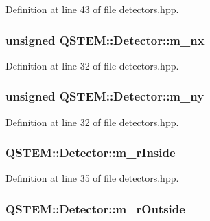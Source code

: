 Definition at line 43 of file detectors.\-hpp.

\hypertarget{class_q_s_t_e_m_1_1_detector_a98a9b7fbcb0b63cc3a4f3bedccf3b130}{
\subsubsection[{m\-\_\-nx}]{\setlength{\rightskip}{0pt plus 5cm}unsigned Q\-S\-T\-E\-M\-::\-Detector\-::m\-\_\-nx}}\label{class_q_s_t_e_m_1_1_detector_a98a9b7fbcb0b63cc3a4f3bedccf3b130}


Definition at line 32 of file detectors.\-hpp.

\hypertarget{class_q_s_t_e_m_1_1_detector_aa6d147b7f2cfe5d896a557d06f541752}{
\subsubsection[{m\-\_\-ny}]{\setlength{\rightskip}{0pt plus 5cm}unsigned Q\-S\-T\-E\-M\-::\-Detector\-::m\-\_\-ny}}\label{class_q_s_t_e_m_1_1_detector_aa6d147b7f2cfe5d896a557d06f541752}


Definition at line 32 of file detectors.\-hpp.

\hypertarget{class_q_s_t_e_m_1_1_detector_a554316160796c1c5ef7d91ddb90dcb20}{
\subsubsection[{m\-\_\-r\-Inside}]{ Q\-S\-T\-E\-M\-::\-Detector\-::m\-\_\-r\-Inside}}\label{class_q_s_t_e_m_1_1_detector_a554316160796c1c5ef7d91ddb90dcb20}


Definition at line 35 of file detectors.\-hpp.

\hypertarget{class_q_s_t_e_m_1_1_detector_ae4ed186da1ff338dbc9b21e94cb44c6e}{
\subsubsection[{m\-\_\-r\-Outside}]{ Q\-S\-T\-E\-M\-::\-Detector\-::m\-\_\-r\-Outside}}\label{class_q_s_t_e_m_1_1_detector_ae4ed186da1ff338dbc9b21e94cb44c6e}


